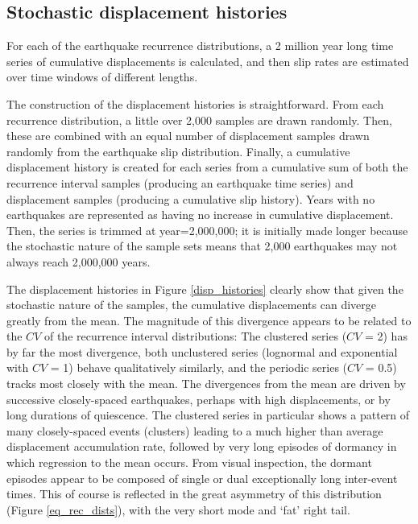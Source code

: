 \documentclass[se]{copernicus}
\begin{document}
\subsection{Stochastic displacement
histories}\label{stochastic-displacement-histories}

For each of the earthquake recurrence distributions, a 2 million year
long time series of cumulative displacements is calculated, and then
slip rates are estimated over time windows of different lengths.

The construction of the displacement histories is straightforward. From
each recurrence distribution, a little over 2,000 samples are drawn
randomly. Then, these are combined with an equal number of displacement
samples drawn randomly from the earthquake slip distribution. Finally, a
cumulative displacement history is created for each series from a
cumulative sum of both the recurrence interval samples (producing an
earthquake time series) and displacement samples (producing a cumulative
slip history). Years with no earthquakes are represented as having no
increase in cumulative displacement. Then, the series is trimmed at
year=2,000,000; it is initially made longer because the stochastic
nature of the sample sets means that 2,000 earthquakes may not always
reach 2,000,000 years.

The displacement histories in Figure \ref{disp_histories} clearly show
that given the stochastic nature of the samples, the cumulative
displacements can diverge greatly from the mean. The magnitude of this
divergence appears to be related to the \(CV\) of the recurrence
interval distributions: The clustered series (\(CV\) = 2) has by far
the most divergence, both unclustered series (lognormal and exponential
with \(CV\) = 1) behave qualitatively similarly, and the periodic
series (\(CV\) = 0.5) tracks most closely with the mean. The
divergences from the mean are driven by successive closely-spaced
earthquakes, perhaps with high displacements, or by long durations of
quiescence. The clustered series in particular shows a pattern of many
closely-spaced events (clusters) leading to a much higher than average
displacement accumulation rate, followed by very long episodes of
dormancy in which regression to the mean occurs. From visual inspection,
the dormant episodes appear to be composed of single or dual
exceptionally long inter-event times. This of course is reflected in the
great asymmetry of this distribution (Figure \ref{eq_rec_dists}), with
the very short mode and `fat' right tail.
\end{document}
